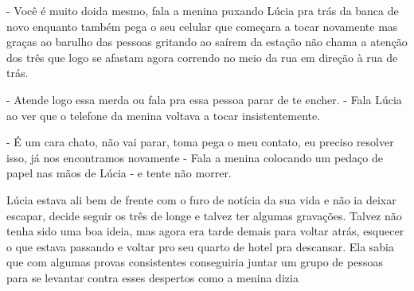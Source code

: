 - Você é muito doida mesmo, fala a menina puxando Lúcia pra trás da banca de novo enquanto também pega o seu celular que começara a tocar novamente mas graças ao barulho das pessoas gritando ao saírem da estação não chama a atenção dos três que logo se afastam agora correndo no meio da rua em direção à rua de trás.

- Atende logo essa merda ou fala pra essa pessoa parar de te encher. - Fala Lúcia ao ver que o telefone da menina voltava a tocar insistentemente.

- É um cara chato, não vai parar, toma pega o meu contato, eu preciso resolver isso, já nos encontramos novamente - Fala a menina colocando um pedaço de papel nas mãos de Lúcia - e tente não morrer.


Lúcia estava ali bem de frente com o furo de notícia da sua vida e não ia deixar escapar, decide seguir os três de longe e talvez ter algumas gravações. Talvez não tenha sido uma boa ideia, mas agora era tarde demais para voltar atrás, esquecer o que estava passando e voltar pro seu quarto de hotel pra descansar. Ela sabia que com algumas provas consistentes conseguiria juntar um grupo de pessoas para se levantar contra esses despertos como a menina dizia
